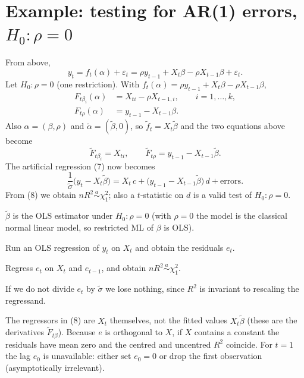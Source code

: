 \documentclass[11pt]{article}
\begin{document}
\section{Example: testing for AR(1) errors, $H_{0}\colon\rho=0$}

From above,
\[ y_{t}=f_{t}(\alpha)+\varepsilon_{t}=\rho y_{t-1}+X_{t}\beta-\rho X_{t-1}\beta+\varepsilon_{t}. \]
Let $H_{0}\colon\rho=0$ (one restriction). With $f_{t}(\alpha)=\rho y_{t-1}+X_{t}\beta-\rho X_{t-1}\beta$,
\begin{align*}
 F_{t\beta_{i}}(\alpha)&=X_{ti}-\rho X_{t-1,i},\qquad i=1,\dots,k,\\
 F_{t\rho}(\alpha)&=y_{t-1}-X_{t-1}\beta .
\end{align*}
Also $\alpha=(\beta,\rho)$ and $\tilde\alpha=(\tilde\beta,0)$, so $\tilde f_{t}=X_{t}\tilde\beta$ and the two equations above become
\[ \tilde F_{t\beta_{i}}=X_{ti},\qquad \tilde F_{t\rho}=y_{t-1}-X_{t-1}\tilde\beta . \]
The artificial regression (7) now becomes
\begin{equation}\tag{8}
 \frac1{\tilde\sigma}\bigl(y_{t}-X_{t}\tilde\beta\bigr)=X_{t}\,c+\bigl(y_{t-1}-X_{t-1}\tilde\beta\bigr)\,d+\text{errors}.
\end{equation}
From (8) we obtain $nR^{2}\overset{a}{\sim}\chi^{2}_{1}$; also a $t$-statistic on $d$ is a valid test of
$H_{0}\colon\rho=0$.

 $\tilde\beta$ is the OLS estimator under $H_{0}\colon\rho=0$ (with $\rho=0$ the model is the classical
normal linear model, so restricted ML of $\beta$ is OLS).

\begin{flatlist}
 \item[Step 1] Run an OLS regression of $y_{t}$ on $X_{t}$ and obtain the residuals $e_{t}$.
 \item[Step 2] Regress $e_{t}$ on $X_{t}$ and $e_{t-1}$, and obtain $nR^{2}\overset{a}{\sim}\chi^{2}_{1}$.
\end{flatlist}
 If we do not divide $e_{t}$ by $\tilde\sigma$ we lose nothing, since $R^{2}$ is invariant to rescaling the
regressand.

 The regressors in (8) are $X_{t}$ themselves, not the fitted values $X_{t}\tilde\beta$ (these are
the derivatives $\tilde F_{t\beta}$). Because $e$ is orthogonal to $X$, if $X$ contains a constant the
residuals have mean zero and the centred and uncentred $R^{2}$ coincide. For $t=1$ the lag $e_{0}$ is
unavailable: either set $e_{0}=0$ or drop the first observation (asymptotically irrelevant).
\end{document}
